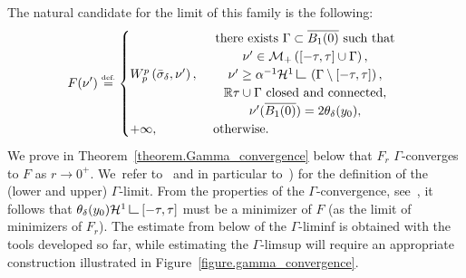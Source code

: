 \documentclass[10pt]{amsart}
\theoremstyle{definition}
\newcommand{\eqdef}{\ensuremath{\stackrel{\mbox{\upshape\tiny def.}}{=}}}
\newcommand\LM[1]{\hbox{\vrule width.5pt \vbox to#1pt{\vfill \hrule width#1pt height.5pt}}}
\newcommand\LL{{\mathchoice {\>\LM7\>}{\>\LM7\>}{\,\LM5\,}{\,\LM{3.35}\,}}}
\newcommand{\mres}{\LL}
\newcommand\cH{\mathcal{H}}
\newcommand{\RR}{\mathbb{R}}
\begin{document}
The natural candidate for the limit of this family is the following:
\begin{equation}\label{Gamma_limitF}
F(\nu') \eqdef
\begin{cases}
W_p^p\left( \bar \sigma_{\delta}, \nu' \right),&
\begin{array}{c}
\text{there exists $\Gamma \subset \overline{B_1(0)}$ such that}\\
\nu' \in \mathcal{M}_+\left([-\tau, \tau] \cup \Gamma\right),
\\ \nu' \ge \alpha^{-1}\cH^1\mres \left(\Gamma\setminus[-\tau,\tau]\right),\\
\RR\tau \cup \Gamma \text{ closed and connected},\\ \nu'(\overline{B_1(0)}) = 2\theta_\delta(y_0),
\end{array} \\
+\infty,& \text{ otherwise.}
\end{cases}
\end{equation}
We prove in Theorem~\ref{theorem.Gamma_convergence} below that $F_r$ $\Gamma$-converges to $F$ as $r\to 0^+$. We~refer to~\cite{dal_maso_introduction_1993,braides_gamma-convergence_2002} and in particular to~\cite[Def.\,1.24]{braides_gamma-convergence_2002}) for the definition of the (lower and upper) $\Gamma$-limit. From the properties of the $\Gamma$-convergence, see~\cite[Cor.\,7.20]{dal_maso_introduction_1993}, it follows that $\theta_\delta(y_0)\cH^1\mres [-\tau, \tau]$ must be a minimizer of $F$ (as the limit of minimizers of $F_r$). The estimate from below of the $\Gamma$-liminf is obtained with the tools developed so far, while estimating the $\Gamma$-limsup will require an appropriate construction illustrated in Figure~\ref{figure.gamma_convergence}.
\end{document}
